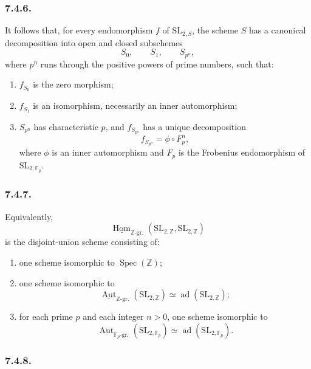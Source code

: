 \subsubsection*{7.4.6.}

It follows that, for every endomorphism \(f\) of
\(\mathrm{SL}_{2,S}\), the scheme \(S\) has a canonical decomposition
into open and closed subschemes
\[
  S_0,\qquad S_1,\qquad S_{p^n},
\]
where \(p^n\) runs through the positive powers of prime numbers, such
that:
\begin{enumerate}
\item[(i)] \(f_{S_0}\) is the zero morphism;
\item[(ii)] \(f_{S_1}\) is an isomorphism, necessarily an inner
  automorphism;
\item[(iii)] \(S_{p^n}\) has characteristic \(p\), and
  \(f_{S_{p^n}}\) has a unique decomposition
  \[
    f_{S_{p^n}}=\phi\circ F_p^n,
  \]
  where \(\phi\) is an inner automorphism and \(F_p\) is the Frobenius
  endomorphism of \(\mathrm{SL}_{2,\mathbb F_p}\).
\end{enumerate}

\subsubsection*{7.4.7.}

Equivalently,
\[
  \underline{\operatorname{Hom}}_{\mathbb Z\text{-}\mathrm{gr.}}
    (\mathrm{SL}_{2,\mathbb Z},\mathrm{SL}_{2,\mathbb Z})
\]
is the disjoint-union scheme consisting of:
\begin{enumerate}
\item[(i)] one scheme isomorphic to \(\operatorname{Spec}(\mathbb Z)\);
\item[(ii)] one scheme isomorphic to
  \[
    \underline{\operatorname{Aut}}_{\mathbb Z\text{-}\mathrm{gr.}}
      (\mathrm{SL}_{2,\mathbb Z})
    \simeq
    \operatorname{ad}(\mathrm{SL}_{2,\mathbb Z});
  \]
\item[(iii)] for each prime \(p\) and each integer \(n>0\), one scheme
  isomorphic to
  \[
    \underline{\operatorname{Aut}}_{\mathbb F_p\text{-}\mathrm{gr.}}
      (\mathrm{SL}_{2,\mathbb F_p})
    \simeq
    \operatorname{ad}(\mathrm{SL}_{2,\mathbb F_p}).
  \]
\end{enumerate}

\subsubsection*{7.4.8.}

